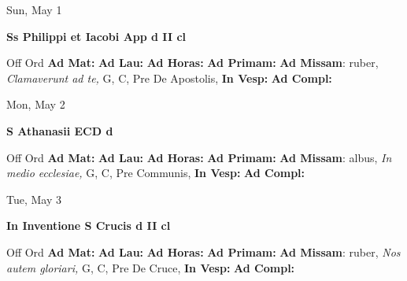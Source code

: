 \documentclass[10pt]{memoir}
\begin{document}
\begin{center}
\begin{minipage}{3.5in}
\vspace{2em}
\begin{center}Sun, May 1
\end{center}
\textbf{ \large Ss Philippi et Iacobi App
\textnormal{\normalsize d II cl}}

\begin{justify}Off Ord
\textbf{Ad Mat: }
\textbf{Ad Lau: }
\textbf{Ad Horas: }
\textbf{Ad Primam: }\textbf{Ad Missam}: ruber, \textit{Clamaverunt ad te,} G, C, Pre De Apostolis, 
\textbf{In Vesp: }
\textbf{Ad Compl: }
\end{justify}
\end{minipage}
\end{center}

\begin{center}
\begin{minipage}{3.5in}
\vspace{2em}
\begin{center}Mon, May 2
\end{center}
\textbf{ \large S Athanasii ECD
\textnormal{\normalsize d}}

\begin{justify}Off Ord
\textbf{Ad Mat: }
\textbf{Ad Lau: }
\textbf{Ad Horas: }
\textbf{Ad Primam: }\textbf{Ad Missam}: albus, \textit{In medio ecclesiae,} G, C, Pre Communis, 
\textbf{In Vesp: }
\textbf{Ad Compl: }
\end{justify}
\end{minipage}
\end{center}

\begin{center}
\begin{minipage}{3.5in}
\vspace{2em}
\begin{center}Tue, May 3
\end{center}
\textbf{ \large In Inventione S Crucis
\textnormal{\normalsize d II cl}}

\begin{justify}Off Ord
\textbf{Ad Mat: }
\textbf{Ad Lau: }
\textbf{Ad Horas: }
\textbf{Ad Primam: }\textbf{Ad Missam}: ruber, \textit{Nos autem gloriari,} G, C, Pre De Cruce, 
\textbf{In Vesp: }
\textbf{Ad Compl: }
\end{justify}
\end{minipage}
\end{center}
\end{document}
